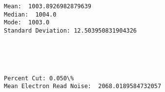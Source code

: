 \documentclass[11pt]{article}
\begin{document}
    \begin{Verbatim}[commandchars=\\\{\}]
Mean:  1003.8926982879639 
Median:  1004.0 
Mode:  1003.0 
Standard Deviation: 12.503950831904326

    \end{Verbatim}

    \begin{center}
    \end{center}
    { \hspace*{\fill} \\}
    
    \begin{center}
    \end{center}
    { \hspace*{\fill} \\}
    
    \begin{Verbatim}[commandchars=\\\{\}]
Percent Cut: 0.050\%
Mean Electron Read Noise:  2068.0189584732057

    \end{Verbatim}
\end{document}
